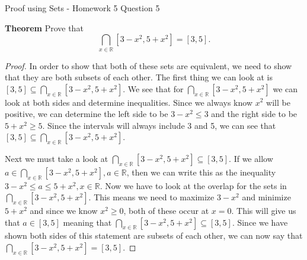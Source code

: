 Proof using Sets - Homework 5 Question 5

\textbf{Theorem}
Prove that 
\[\bigcap_{x\in\mathbb{R}} [3-x^2,5+x^2]=[3,5].\]

\begin{proof}
In order to show that both of these sets are equivalent, we need to show that they are both subsets of each other. The first thing we can look at is $[3,5]\subseteq\bigcap_{x\in\mathbb{R}} [3-x^2,5+x^2]$. We see that for $\bigcap_{x\in\mathbb{R}} [3-x^2,5+x^2]$ we can look at both sides and determine inequalities. Since we always know $x^2$ will be positive, we can determine the left side to be $ 3 - x^2 \leq 3$ and the right side to be $5 + x^2 \geq 5$. Since the intervals will always include 3 and 5, we can see that $[3,5]\subseteq\bigcap_{x\in\mathbb{R}} [3-x^2,5+x^2]$. 

Next we must take a look at $\bigcap_{x\in\mathbb{R}} [3-x^2,5+x^2]\subseteq[3,5].$ If we allow $ a \in \bigcap_{x\in\mathbb{R}} [3-x^2,5+x^2], a \in \mathbb{R}$, then we can write this as the inequality $3 - x^2 \leq a \leq 5 + x^2, x \in \mathbb{R}$. Now we have to look at the overlap for the sets in $\bigcap_{x\in\mathbb{R}} [3-x^2,5+x^2]$. This means we need to maximize $3 - x^2$ and minimize $5 + x^2$ and since we know $x^2 \geq 0$, both of these occur at $x=0$. This will give us that $a \in [3,5]$ meaning that $\bigcap_{x\in\mathbb{R}} [3-x^2,5+x^2]\subseteq[3,5]$. Since we have shown both sides of this statement are subsets of each other, we can now say that $\bigcap_{x\in\mathbb{R}} [3-x^2,5+x^2]=[3,5].$
\end{proof}